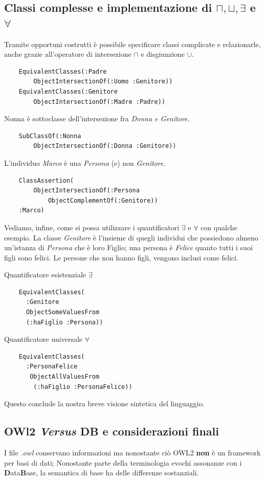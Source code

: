 \subsection{Classi complesse e implementazione di $ \sqcap,\sqcup,\exists $ e $ \forall $}
Tramite opportuni costrutti è possibile specificare classi complicate e relazionarle, 
anche grazie all'operatore di intersezione $\cap$ e disgiunzione $ \cup $.
\begin{verbatim}
	EquivalentClasses(:Padre
		ObjectIntersectionOf(:Uomo :Genitore))
	EquivalentClasses(:Genitore
		ObjectIntersectionOf(:Madre :Padre))
\end{verbatim}
Nonna è sottoclasse dell'intersezione fra \textit{Donna e Genitore}.
\begin{verbatim}
	SubClassOf(:Nonna 
		ObjectIntersectionOf(:Donna :Genitore))
\end{verbatim}
L'individuo \textit{Marco} è una \textit{Persona} (e) non \textit{Genitore}.
\begin{verbatim}
	ClassAssertion(
		ObjectIntersectionOf(:Persona 
			ObjectComplementOf(:Genitore))
	:Marco)
\end{verbatim}
Vediamo, infine, come si possa utilizzare i quantificatori $ \exists $ e $ \forall $ con qualche esempio.
La classe \textit{Genitore} è l'insieme di quegli individui che possiedono almeno un'istanza 
di \textit{Persona} che è loro Figlio; una persona è \textit{Felice} quanto tutti 
i suoi figli sono felici. Le persone che non hanno figli, vengono inclusi come felici.
\begin{multicols}{2}
	Quantificatore esistenziale $ \exists $
	\begin{verbatim}
	EquivalentClasses(
	  :Genitore
	  ObjectSomeValuesFrom
	  (:haFiglio :Persona))
	\end{verbatim}
	
	Quantificatore universale $ \forall $
	\begin{verbatim}
	EquivalentClasses(
	  :PersonaFelice
	   ObjectAllValuesFrom
	    (:haFiglio :PersonaFelice))
	\end{verbatim}
\end{multicols}

Questo conclude la nostra breve visione sintetica del linguaggio.

\subsection{OWl2 \emph{Versus} DB e considerazioni finali}
I file \textit{.owl} conservano informazioni ma nonostante ciò OWL2 \textbf{non} è un framework
per basi di dati; Nonostante parte della terminologia evochi assonanze con i \textbf{D}ata\textbf{B}ase, 
la semantica di base ha delle differenze sostanziali.

